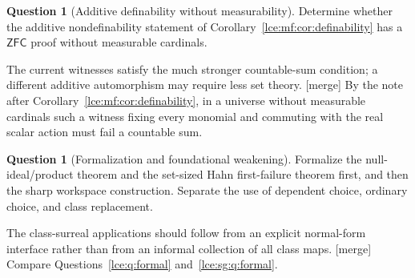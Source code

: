 \documentclass[11pt,letterpaper]{article}
\numberwithin{equation}{section}
\theoremstyle{definition}
\newtheorem{question}[theorem]{Question}
\theoremstyle{remark}
\newcommand{\ZFC}{\mathsf{ZFC}}
\newcommand{\mergetag}{\textup{\textsf{\small[merge]}}}%
\begin{document}
\begin{question}[Additive definability without measurability]\label{lce:mf:q:definability}
Determine whether the additive nondefinability statement of
Corollary~\ref{lce:mf:cor:definability} has a $\ZFC$ proof without
measurable cardinals.
\end{question}
The current witnesses satisfy the much stronger countable-sum condition; a
different additive automorphism may require less set theory. \mergetag{} By
the note after Corollary~\ref{lce:mf:cor:definability}, in a universe
without measurable cardinals such a witness fixing every monomial and
commuting with the real scalar action must fail a countable sum.

\begin{question}[Formalization and foundational weakening]\label{lce:mf:q:formal}
Formalize the null-ideal/product theorem and the set-sized Hahn
first-failure theorem first, and then the sharp workspace construction.
Separate the use of dependent choice, ordinary choice, and class
replacement.
\end{question}
The class-surreal applications should follow from an explicit normal-form
interface rather than from an informal collection of all class maps.
\mergetag{} Compare Questions~\ref{lce:q:formal} and~\ref{lce:sg:q:formal}.
\end{document}
